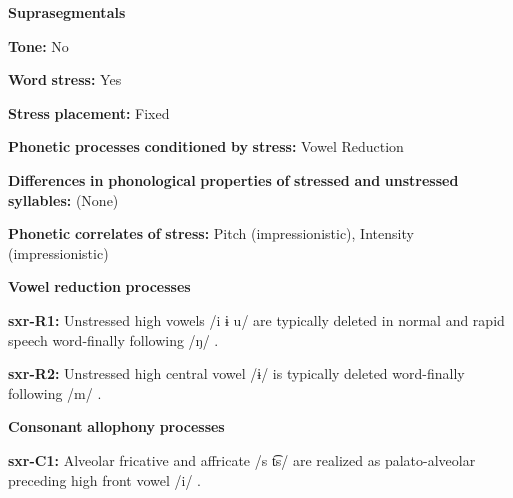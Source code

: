 \begin{styleBody}
\textbf{Suprasegmentals}
\end{styleBody}

\begin{styleBody}
\textbf{Tone:} No
\end{styleBody}

\begin{styleBody}
\textbf{Word} \textbf{stress:} Yes
\end{styleBody}

\begin{styleBody}
\textbf{Stress} \textbf{placement:} Fixed
\end{styleBody}

\begin{styleBody}
\textbf{Phonetic} \textbf{processes} \textbf{conditioned} \textbf{by} \textbf{stress:} Vowel Reduction
\end{styleBody}

\begin{styleBody}
\textbf{Differences} \textbf{in} \textbf{phonological} \textbf{properties} \textbf{of} \textbf{stressed} \textbf{and} \textbf{unstressed} \textbf{syllables:} (None)
\end{styleBody}

\begin{styleBody}
\textbf{Phonetic} \textbf{correlates} \textbf{of} \textbf{stress:} Pitch (impressionistic), Intensity (impressionistic)
\end{styleBody}

\begin{styleBody}
\textbf{Vowel} \textbf{reduction} \textbf{processes}
\end{styleBody}

\begin{styleBody}
\textbf{sxr-R1:} Unstressed high vowels /i ɨ u/ are typically deleted in normal and rapid speech word-finally following /ŋ/ \citep[38]{Pan2012}.
\end{styleBody}

\begin{styleBody}
\textbf{sxr-R2:} Unstressed high central vowel /ɨ/ is typically deleted word-finally following /m/ \citep[39]{Pan2012}.
\end{styleBody}

\begin{styleBody}
\textbf{Consonant} \textbf{allophony} \textbf{processes}
\end{styleBody}

\begin{styleBody}
\textbf{sxr-C1:} Alveolar fricative and affricate /s t͡s/ are realized as palato-alveolar preceding high front vowel /i/ \citep[28]{Pan2012}.
\end{styleBody}

